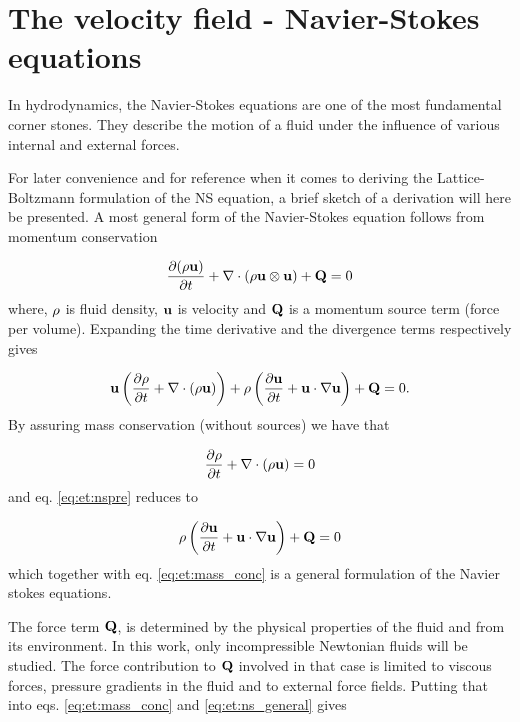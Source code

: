 \section{The velocity field - Navier-Stokes equations}\label{sec:et:ns}
In hydrodynamics, the Navier-Stokes equations are one of the most
fundamental corner stones. They describe the motion of a fluid under
the influence of various internal and external forces. 

For later convenience and for reference when it comes to deriving the
Lattice-Boltzmann formulation of the NS equation, a brief sketch of a
derivation will here be presented. A most general form of the
Navier-Stokes equation follows from momentum conservation

\begin{equation}
\dfrac{\partial (\mathrm{\rho} \mathbf{u})}{\partial t} + \nabla \cdot (\rho \mathbf{u}
\otimes \mathbf{u}) + \mathbf{Q} = 0 
\end{equation}
where, $\mathrm{\rho}$ is fluid density, $\mathbf{u}$ is velocity and $\mathbf{Q}$ is a
momentum source term (force per volume). Expanding the time
derivative and the divergence terms respectively gives
 
\begin{equation}\label{eq:et:nspre}
\mathbf{u} \left ( \dfrac{\partial \mathrm{\rho}}{\partial t} + \nabla \cdot
  (\mathrm{\rho} \mathbf{u}) \right ) + \mathrm{\rho} \left (\dfrac{\partial \mathbf{u}}{\partial t} +
  \mathbf{u} \cdot \nabla \mathbf{u} 
  \right ) + \mathbf{Q} = 0.
\end{equation}
By assuring mass conservation (without sources) we have that

\begin{equation}\label{eq:et:mass_conc}
 \dfrac{\partial \mathrm{\rho}}{\partial t} + \nabla \cdot(
  \mathrm{\rho} \mathbf{u}) = 0
\end{equation}
and eq. \eqref{eq:et:nspre} reduces to

\begin{equation}\label{eq:et:ns_general} 
\mathrm{\rho} \left (\dfrac{\partial \mathbf{u}}{\partial t} +
  \mathbf{u} \cdot \nabla \mathbf{u} 
  \right ) + \mathbf{Q} = 0
\end{equation}
which together with eq. \eqref{eq:et:mass_conc} is a general
formulation of the Navier stokes equations. 

The force term $\mathbf{Q}$, is determined by the physical properties of the
fluid and from its environment. In this work, only incompressible
Newtonian fluids will be studied. The force contribution to $\mathbf{Q}$
involved in that case is limited to viscous forces, pressure gradients
in the fluid and to external force fields. Putting that into
eqs. \eqref{eq:et:mass_conc} and \eqref{eq:et:ns_general} gives

